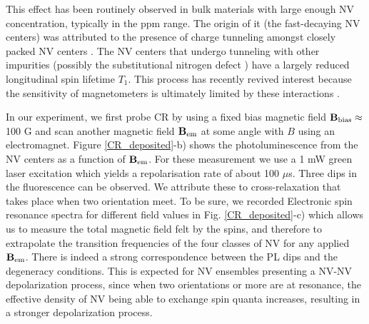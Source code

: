 \documentclass[preprintnumbers,amsmath,amssymb,superscriptaddress,twocolumn,showpacs]{revtex4-1}
\begin{document}
This effect has been routinely observed in bulk materials with large enough  NV concentration, typically in the ppm range. The origin of it (the fast-decaying NV centers)  was attributed to the presence of charge tunneling amongst closely packed NV centers \cite{choi_depolarization_2017}. The NV centers that undergo tunneling with other impurities (possibly the substitutional nitrogen defect \cite{manson_nv_2018}) have a largely reduced longitudinal spin lifetime $T_1$.
This process has recently revived interest because the sensitivity of magnetometers is ultimately limited by these interactions \cite{Zhou}. 

In our experiment, we first probe CR by using a fixed bias magnetic field $\bf B_{\rm bias} \approx$ 100 G and scan another magnetic field $\bf B_{\rm em}$ at some angle with $B$ using an electromagnet. 
Figure \ref{CR_deposited}-b) shows the photoluminescence from the NV centers as a function of $\bf B_{\rm em}$. 
For these measurement we use a 1 mW green laser excitation which yields a repolarisation rate of about 100 $\mu$s. 
Three dips in the fluorescence can be observed. 
We attribute these to cross-relaxation that takes place when two orientation meet. To be sure, we recorded Electronic spin resonance spectra for different field values in Fig. \ref{CR_deposited}-c) which allows us to measure the total magnetic field felt by the spins, and therefore to extrapolate the transition frequencies of the four classes of NV for any applied $\bf B_{\rm em}$.
There is indeed a strong correspondence between the PL dips and the degeneracy conditions. 
This is expected for NV ensembles presenting a NV-NV depolarization process, since when two orientations or more are at resonance, the effective density of NV being able to exchange spin quanta increases, resulting in a stronger depolarization process.
\end{document}
